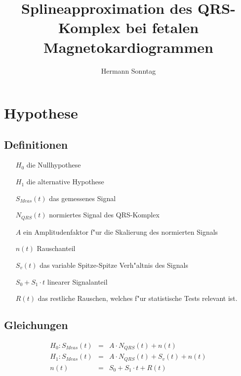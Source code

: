 \documentclass[a4paper,12pt]{scrartcl}
\title{Splineapproximation des QRS-Komplex bei fetalen Magnetokardiogrammen}
\author{Hermann Sonntag}
\begin{document}
\maketitle

\begin{abstract}


\end{abstract}

\section{Hypothese}
\subsection{Definitionen}
\begin{itemize}
\item[$H_0$] die Nullhypothese
\item[$H_1$] die alternative Hypothese
\item[$S_{Meas}\left(t\right)$] das gemessenes Signal
\item[$N_{QRS}\left(t\right)$] normiertes Signal des QRS-Komplex
\item[$A$] ein Amplitudenfaktor f"ur die Skalierung des normierten Signals
\item[$n\left(t\right)$] Rauschanteil
\item[$S_v\left(t\right)$] das variable Spitze-Spitze Verh"altnis des Signals
\item[$S_0 + S_1 \cdot t$] linearer Signalanteil
\item[$R\left(t\right)$] das restliche Rauschen, welches f"ur statistische Tests relevant ist.
\end{itemize}
\subsection{Gleichungen}
\begin{eqnarray}
H_0 : S_{Meas}\left(t\right) & = & A \cdot N_{QRS}\left(t\right) + n\left(t\right) \\
H_1: S_{Meas}\left(t\right) & = & A \cdot N_{QRS}\left(t\right) + S_v\left(t\right) + n\left(t\right) \\
n\left(t\right) & = & S_0 + S_1 \cdot t + R\left(t\right)
\end{eqnarray}
\end{document}
